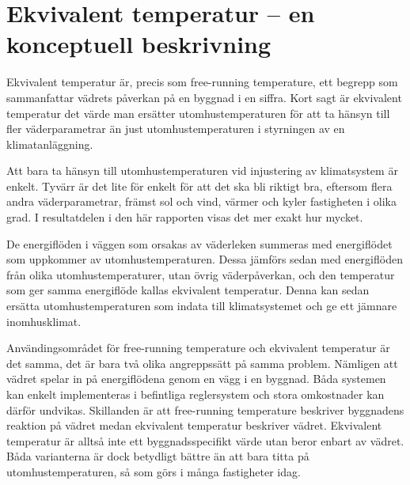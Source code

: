 \section{Ekvivalent temperatur  – en konceptuell beskrivning}

Ekvivalent temperatur är, precis som free-running temperature, ett begrepp som sammanfattar vädrets påverkan på en byggnad i en siffra. Kort sagt är ekvivalent temperatur det värde man ersätter utomhustemperaturen för att ta 
hänsyn till fler väderparametrar än just utomhustemperaturen i styrningen av en 
klimatanläggning.

Att bara ta hänsyn till utomhustemperaturen vid injustering av klimatsystem är enkelt. 
Tyvärr är det lite för enkelt för att det ska bli riktigt bra, eftersom flera andra 
väderparametrar, främst sol och vind, värmer och kyler fastigheten i olika grad. I resultatdelen i den här rapporten visas det mer exakt hur mycket.

De energiflöden i väggen som orsakas av väderleken summeras med energiflödet 
som uppkommer av utomhustemperaturen. Dessa jämförs sedan med energiflöden från 
olika utomhustemperaturer, utan övrig väderpåverkan, och den temperatur som ger 
samma energiflöde kallas ekvivalent temperatur. Denna kan sedan ersätta 
utomhustemperaturen som indata till klimatsystemet och ge ett jämnare inomhusklimat. 

Användingsområdet för free-running temperature och ekvivalent temperatur är det samma, det är bara två olika angreppssätt på samma problem. Nämligen att vädret spelar in på energiflödena genom en vägg i en byggnad.  Båda systemen kan enkelt implementeras i befintliga reglersystem och stora omkostnader kan därför undvikas. Skillanden är att  free-running temperature beskriver byggnadens reaktion på vädret medan ekvivalent temperatur beskriver vädret. Ekvivalent temperatur är alltså inte ett byggnadsspecifikt värde utan beror enbart av vädret. Båda varianterna är dock betydligt bättre än att bara titta på utomhustemperaturen, så som görs i många fastigheter idag.



